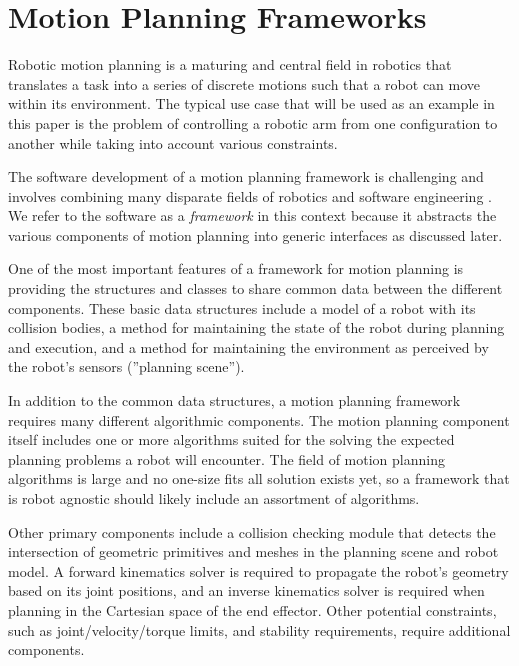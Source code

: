 \documentclass[10pt,journal,compsoc]{joser1}
\begin{document}
{%
\section{Motion Planning Frameworks}
\label{sec::motion_planning}

Robotic motion planning is a maturing and central field in robotics \cite{moll2011teaching} that translates a task into a series of discrete motions such that a robot can move within its environment. The typical use case that will be used as an example in this paper is the problem of controlling a robotic arm from one configuration to another while taking into account various constraints.

The software development of a motion planning framework is challenging and involves combining many disparate fields of robotics and software engineering \cite{perez2010roadmap}. We refer to the software as a \textit{framework} in this context because it abstracts the various components of motion planning into generic interfaces as discussed later.

One of the most important features of a framework for motion planning is providing the structures and classes to share common data between the different components. These basic data structures include a model of a robot with its collision bodies, a method for maintaining the state of the robot during planning and execution, and a method for maintaining the environment as perceived by the robot's sensors (''planning scene'').

In addition to the common data structures, a motion planning framework requires many different algorithmic components. The motion planning component itself includes one or more algorithms suited for the solving the expected planning problems a robot will encounter. The field of motion planning algorithms is large and no one-size fits all solution exists yet, so a framework that is robot agnostic should likely include an assortment of algorithms.

Other primary components include a collision checking module that detects the intersection of geometric primitives and meshes in the planning scene and robot model. A forward kinematics solver is required to propagate the robot's geometry based on its joint positions, and an inverse kinematics solver is required when planning in the Cartesian space of the end effector. Other potential constraints, such as joint/velocity/torque limits, and stability requirements, require additional components.

}
\end{document}
